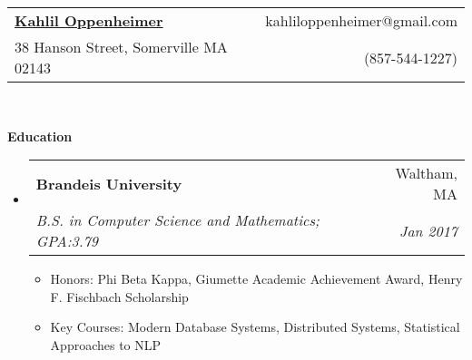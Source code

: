 \documentclass[letterpaper,11pt]{article}
\makeatletter
\newcommand{\resitem}[1]{\item #1 \vspace{-2pt}}
\newcommand{\resheading}[1]{{\large \colorbox{mygrey}{\begin{minipage}{\textwidth}{\textbf{#1 \vphantom{p\^{E}}}}\end{minipage}}}}
\newcommand{\ressubheading}[4]{
\begin{tabular*}{6.5in}{l@{\extracolsep{\fill}}r}
		\textbf{#1} & #2 \\
		\textit{#3} & \textit{#4} \\
\end{tabular*}\vspace{-6pt}}
\makeatother
\begin{document}
\newcommand{\mywebheader}{
\begin{tabular*}{7in}{l@{\extracolsep{\fill}}r}
	\textbf{\LARGE \href{https://kahlil.me}{Kahlil Oppenheimer}} & {kahliloppenheimer@gmail.com} \\
38 Hanson Street, Somerville MA 02143 & (857-544-1227) \\
	\end{tabular*}
\\
\vspace{0.1in}}

\mywebheader

\resheading{Education}
	\begin{itemize}
		\item
			\ressubheading{Brandeis University}{Waltham, MA}{B.S. in Computer Science and Mathematics; GPA:3.79}{Jan 2017}
				{ \footnotesize
				\begin{itemize}
                    \resitem{Honors: Phi Beta Kappa, Giumette Academic Achievement Award, Henry F. Fischbach Scholarship}
					\resitem{Key Courses: Modern Database Systems, Distributed Systems, Statistical Approaches to NLP}
				\end{itemize}
				}
	\end{itemize} %
\end{document}
